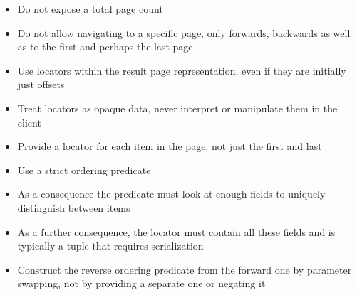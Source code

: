 \documentclass[11pt,a4paper]{article}
\begin{document}
\begin{multicols*}{2}
\begin{itemize}
\item Do not expose a total page count
\item Do not allow navigating to a specific page, only forwards, backwards as
well as to the first and perhaps the last page
\item Use locators within the result page representation, even if they are
initially just offsets
\item Treat locators as opaque data, never interpret or manipulate them in the
client
\item Provide a locator for each item in the page, not just the first and last
\item Use a strict ordering predicate
\item As a consequence the predicate must
look at enough fields to uniquely distinguish between items
\item As a further consequence, the locator must contain all these fields and is
typically a tuple that requires serialization
\item Construct the reverse ordering predicate from the forward one by parameter
swapping, not by providing a separate one or negating it
\end{itemize}
\end{multicols*}
\end{document}
